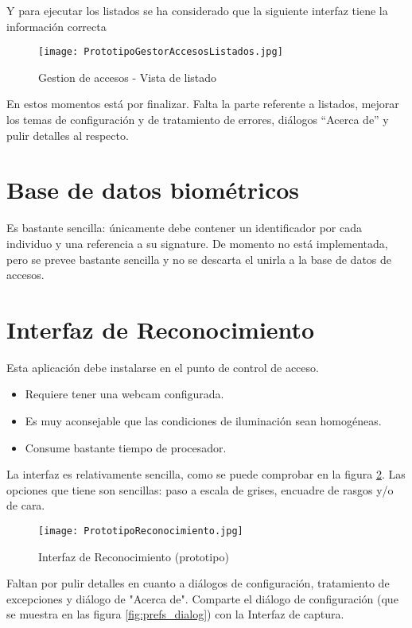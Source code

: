 Y para ejecutar los listados se ha considerado que la siguiente interfaz tiene la información correcta
\begin{figure}[h!]
        \centering
        \texttt{[image: PrototipoGestorAccesosListados.jpg]}
        \caption{Gestion de accesos - Vista de listado}
	\label{fig:gestion_accesos_list}
\end{figure}

En estos momentos está por finalizar. Falta la parte referente a listados, mejorar los temas de configuración y de tratamiento de errores, diálogos ``Acerca de'' y pulir detalles al respecto.

\section{Base de datos biométricos}
Es bastante sencilla: únicamente debe contener un identificador por cada individuo y una referencia a su signature. De momento no está implementada, pero se prevee bastante sencilla y no se descarta el unirla a la base de datos de accesos.

\section{Interfaz de Reconocimiento}
Esta aplicación debe instalarse en el punto de control de acceso.

\begin{itemize}
	\item{Requiere tener una webcam configurada.}
	\item{Es muy aconsejable que las condiciones de iluminación sean homogéneas.}
	\item{Consume bastante tiempo de procesador.}
\end{itemize}

La interfaz es relativamente sencilla, como se puede comprobar en la figura \ref{fig:reconocimiento}. Las opciones que tiene son sencillas: paso a escala de grises, encuadre de rasgos y/o de cara. 
\begin{figure}[h!]
        \centering
        \texttt{[image: PrototipoReconocimiento.jpg]}
        \caption{Interfaz de Reconocimiento (prototipo)}
	\label{fig:reconocimiento}
\end{figure}

Faltan por pulir detalles en cuanto a diálogos de configuración, tratamiento de excepciones y diálogo de "Acerca de". Comparte el diálogo de configuración (que se muestra en las figura \ref{fig:prefs_dialog}) con la Interfaz de captura.

